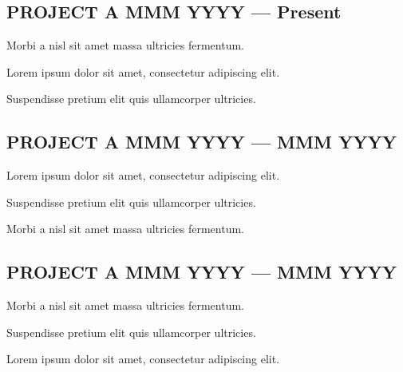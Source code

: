 \subsection{{PROJECT A \hfill MMM YYYY --- Present}}
\begin{zitemize}
\item Morbi a nisl sit amet massa ultricies fermentum.
\item Lorem ipsum dolor sit amet, consectetur adipiscing elit.
\item Suspendisse pretium elit quis ullamcorper ultricies.
\end{zitemize}

\subsection{{PROJECT A \hfill MMM YYYY --- MMM YYYY}}
\begin{zitemize}
\item Lorem ipsum dolor sit amet, consectetur adipiscing elit.
\item Suspendisse pretium elit quis ullamcorper ultricies.
\item Morbi a nisl sit amet massa ultricies fermentum.
\end{zitemize}

\subsection{{PROJECT A \hfill MMM YYYY --- MMM YYYY}}
\begin{zitemize}
\item Morbi a nisl sit amet massa ultricies fermentum.
\item Suspendisse pretium elit quis ullamcorper ultricies.
\item Lorem ipsum dolor sit amet, consectetur adipiscing elit.
\end{zitemize}
